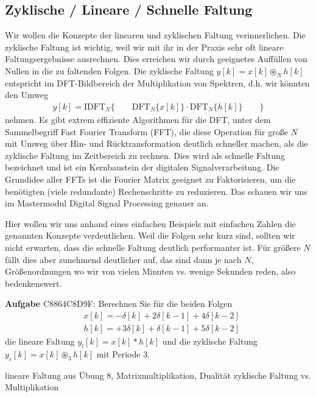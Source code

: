 \subsection{Zyklische / Lineare / Schnelle Faltung}
\label{sec:C8864C8D9F}
\begin{Ziel}
Wir wollen die Konzepte der linearen und zyklischen Faltung verinnerlichen.
Die zyklische Faltung ist wichtig, weil wir mit ihr in der Praxis sehr
oft lineare Faltungsergebnisse ausrechnen. Dies erreichen wir
durch geeignetes Auffüllen von Nullen in die zu faltenden Folgen.
Die zyklische Faltung $y[k] = x[k]\circledast_N h[k]$
entspricht im DFT-Bildbereich der Multiplikation von Spektren, d.h. wir könnten
den Umweg
\begin{align}
y[k] = \mathrm{IDFT}_N\{\qquad\mathrm{DFT}_N\{x[k]\} \cdot \mathrm{DFT}_N\{h[k]\}\qquad\}
\end{align}
nehmen. Es gibt extrem effiziente Algorithmen für die DFT,
unter dem Sammelbegriff Fast Fourier Transform (FFT), die diese Operation für
große $N$ mit Umweg über Hin- und Rücktransformation deutlich schneller machen,
als die zyklische Faltung im Zeitbereich zu rechnen. Dies wird als schnelle
Faltung bezeichnet und ist ein Kernbaustein der digitalen Signalverarbeitung.
Die Grundidee aller FFTs ist die Fourier Matrix geeignet zu Faktorisieren, um
die benötigten (viele redundante) Rechenschritte zu reduzieren. Das schauen
wir uns im Mastermodul Digital Signal Processing genauer an.

Hier wollen wir uns anhand eines einfachen Beispiels mit einfachen Zahlen die
genannten Konzepte verdeutlichen. Weil die Folgen sehr kurz sind, sollten wir
nicht erwarten, dass die schnelle Faltung deutlich performanter ist.
Für größere $N$ fällt dies aber zunehmend deutlicher auf, das sind dann je nach $N$,
Größenordnungen wo wir von vielen Minuten vs. wenige Sekunden reden, also bedenkenswert.
\end{Ziel}
\textbf{Aufgabe} {\tiny C8864C8D9F}:
Berechnen Sie für die beiden Folgen
\begin{align}
&x[k] = -\delta[k] +2 \delta[k-1] + 4 \delta[k-2]\\
&h[k] = +3 \delta[k] + \delta[k-1] + 5 \delta[k-2]
\end{align}
die lineare Faltung $y_l[k] = x[k] \ast h[k]$ und die zyklische Faltung
$y_c[k] = x[k] \circledast_3 h[k]$
mit Periode $3$.
\begin{Werkzeug}
lineare Faltung aus Übung 8, Matrixmultiplikation, Dualität zyklische Faltung
vs. Multiplikation
\end{Werkzeug}
